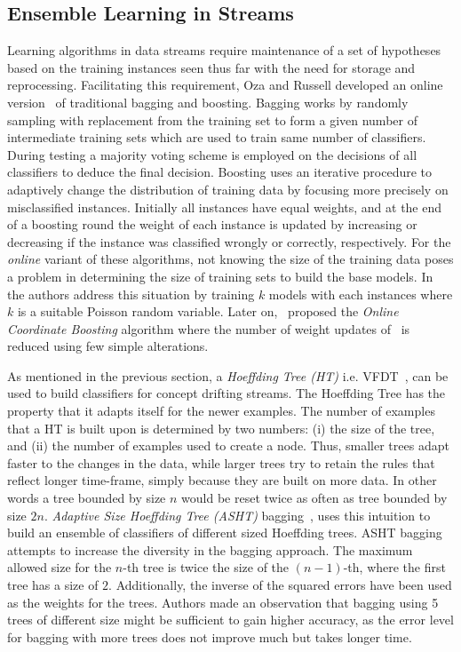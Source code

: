 \subsection{Ensemble Learning in Streams}
Learning algorithms in data streams require maintenance of a set of hypotheses based on the training instances seen thus far with the need for storage and reprocessing. Facilitating this requirement, Oza and Russell developed an online version~\cite{oza01:obagboost, oza01:thesis} of traditional bagging and boosting. Bagging works by randomly sampling with replacement from the training set to form a given number of intermediate training sets which are used to train same number of classifiers. During testing a majority voting scheme is employed on the decisions of all classifiers to deduce the final decision. Boosting uses an iterative procedure to adaptively change the distribution of training data by focusing more precisely on misclassified instances. Initially all instances have equal weights, and at the end of a boosting round the weight of each instance is updated by increasing or decreasing if the instance was classified wrongly or correctly, respectively. For the \textit{online} variant of these algorithms, not knowing the size of the training data poses a problem in determining the size of training sets to build the base models. In~\cite{oza01:obagboost} the authors address this situation by training $k$ models with each instances where $k$ is a suitable Poisson random variable. Later on,~\cite{pelossof08:boosting} proposed the \textit{Online Coordinate Boosting} algorithm where the number of weight updates of~\cite{oza01:obagboost} is reduced using few simple alterations.


As mentioned in the previous section, a \textit{Hoeffding Tree (HT)} i.e. VFDT~\cite{domingos00:vfdt}, can be used to build classifiers for concept drifting streams. The Hoeffding Tree has the property that it adapts itself for the newer examples. The number of examples that a HT is built upon is determined by two numbers: (i) the  size of the tree, and (ii) the number of examples used to create a node. Thus, smaller trees adapt faster to the changes in the data, while larger trees try to retain the rules that reflect longer time-frame, simply because they are built on more data. In other words a tree bounded by size $n$ would be reset twice as often as tree bounded by size $2n$. \textit{Adaptive Size Hoeffding Tree (ASHT)} bagging~\cite{bifet09:asht}, uses this intuition to build an ensemble of classifiers of different sized Hoeffding trees. ASHT bagging attempts to increase the diversity in the bagging approach. The maximum allowed size for the $n$-th tree is twice the size of the $(n-1)$-th, where the first tree has a size of $2$. Additionally, the inverse of the squared errors have been used as the weights for the trees. Authors made an observation that bagging using 5 trees of different size might be sufficient to gain higher accuracy, as the error level for bagging with more trees does not improve much but takes longer time.

